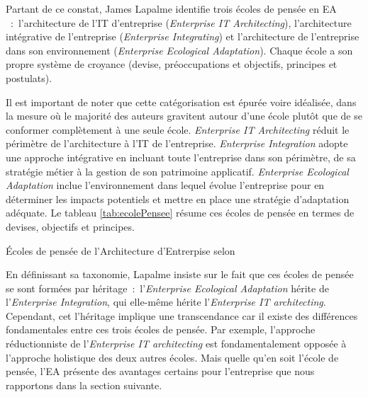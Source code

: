 Partant de ce constat, James Lapalme identifie trois écoles de pensée en EA 
\cite{lapalme2012three}~:~l'architecture de l'IT d'entreprise 
(\textit{Enterprise IT Architecting}), l'architecture intégrative de 
l'entreprise 
(\textit{Enterprise Integrating}) et l'architecture de l'entreprise dans son 
environnement (\textit{Enterprise Ecological Adaptation}). Chaque école a son 
propre système de croyance (devise, préoccupations et objectifs, principes et 
postulats).



Il est important de noter que cette catégorisation est épurée voire
idéalisée, dans la mesure où le majorité des auteurs gravitent autour d'une
école plutôt que de se conformer complètement à une seule école.
\textit{Enterprise IT Architecting} réduit le périmètre de l'architecture à
l'IT de l'entreprise.  \textit{Enterprise Integration} adopte une approche
intégrative en incluant toute l'entreprise dans son périmètre, de sa stratégie
métier à la gestion de son patrimoine applicatif. \textit{Enterprise Ecological
Adaptation} inclue l'environnement dans lequel évolue l'entreprise pour en
déterminer les impacts potentiels et mettre en place une stratégie d'adaptation
adéquate. Le tableau \ref{tab:ecolePensee} résume ces écoles de pensée en
termes de devises, objectifs et principes. 

\begin{table}[!ht]
		
	\caption{Écoles de pensée de l'Architecture d'Entrerpise selon
\protect\cite{lapalme2012three}}
 	\label{tab:ecolePensee}
\end{table}

En définissant sa taxonomie, Lapalme insiste sur le fait que ces écoles de
pensée se sont formées par héritage~:~l'\textit{Enterprise Ecological
Adaptation} hérite de l'\textit{Enterprise Integration}, qui elle-même hérite
l'\textit{Enterprise IT architecting}. Cependant, cet l'héritage implique une
transcendance car il existe des différences fondamentales entre ces trois
écoles de pensée. Par exemple, l'approche réductionniste de
l'\textit{Enterprise IT architecting} est fondamentalement opposée à l'approche
holistique des deux autres écoles. Mais quelle qu'en soit l'école de pensée,
l'EA présente des avantages certains pour l'entreprise que nous rapportons dans
la section suivante. 


